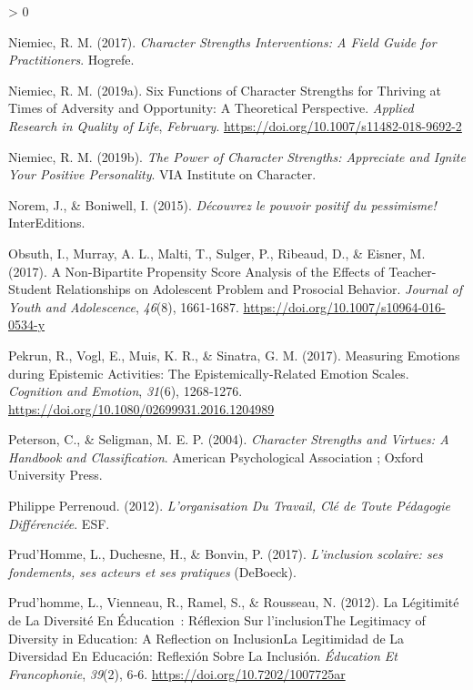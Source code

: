 \documentclass[
  french,
]{article}
\newlength{\cslhangindent}
\newenvironment{CSLReferences}[2] %
 {%
  \setlength{\parindent}{0pt}
  \ifodd #1 \everypar{\setlength{\hangindent}{\cslhangindent}}\ignorespaces\fi
  \ifnum #2 > 0
  \setlength{\parskip}{#2\baselineskip}
  \fi
 }%
 {}
\begin{document}
\begin{CSLReferences}{1}{0}
\leavevmode\hypertarget{ref-niemiec2017b}{}%
Niemiec, R. M. (2017). \emph{Character Strengths Interventions: A Field Guide for Practitioners}. {Hogrefe}.

\leavevmode\hypertarget{ref-niemiec2019}{}%
Niemiec, R. M. (2019a). Six {Functions} of {Character Strengths} for {Thriving} at {Times} of {Adversity} and {Opportunity}: A {Theoretical Perspective}. \emph{Applied Research in Quality of Life}, \emph{February}. \url{https://doi.org/10.1007/s11482-018-9692-2}

\leavevmode\hypertarget{ref-niemiec2019a}{}%
Niemiec, R. M. (2019b). \emph{The {Power} of Character Strengths: Appreciate and Ignite Your Positive Personality}. {VIA Institute on Character}.

\leavevmode\hypertarget{ref-norem2015}{}%
Norem, J., \& Boniwell, I. (2015). \emph{{Découvrez le pouvoir positif du pessimisme!}} {InterEditions}.

\leavevmode\hypertarget{ref-obsuth2017}{}%
Obsuth, I., Murray, A. L., Malti, T., Sulger, P., Ribeaud, D., \& Eisner, M. (2017). A {Non}-Bipartite {Propensity Score Analysis} of the {Effects} of {Teacher}-{Student Relationships} on {Adolescent Problem} and {Prosocial Behavior}. \emph{Journal of Youth and Adolescence}, \emph{46}(8), 1661‑1687. \url{https://doi.org/10.1007/s10964-016-0534-y}

\leavevmode\hypertarget{ref-pekrun2017}{}%
Pekrun, R., Vogl, E., Muis, K. R., \& Sinatra, G. M. (2017). Measuring Emotions during Epistemic Activities: The {Epistemically}-{Related Emotion Scales}. \emph{Cognition and Emotion}, \emph{31}(6), 1268‑1276. \url{https://doi.org/10.1080/02699931.2016.1204989}

\leavevmode\hypertarget{ref-peterson2004}{}%
Peterson, C., \& Seligman, M. E. P. (2004). \emph{Character Strengths and Virtues: A Handbook and Classification}. {American Psychological Association ; Oxford University Press}.

\leavevmode\hypertarget{ref-philippeperrenoud2012}{}%
Philippe Perrenoud. (2012). \emph{L'organisation Du Travail, Clé de Toute Pédagogie Différenciée}. {ESF}.

\leavevmode\hypertarget{ref-prudhomme2017}{}%
Prud'Homme, L., Duchesne, H., \& Bonvin, P. (2017). \emph{{L'inclusion scolaire: ses fondements, ses acteurs et ses pratiques}} (DeBoeck).

\leavevmode\hypertarget{ref-prudhomme2012}{}%
Prud'homme, L., Vienneau, R., Ramel, S., \& Rousseau, N. (2012). La Légitimité de La Diversité En Éducation~: Réflexion Sur l'{inclusionThe Legitimacy} of {Diversity} in {Education}: {A Reflection} on {InclusionLa} Legitimidad de La Diversidad En Educación: Reflexión Sobre La Inclusión. \emph{Éducation Et Francophonie}, \emph{39}(2), 6‑6. \url{https://doi.org/10.7202/1007725ar}


\end{CSLReferences}
\end{document}
